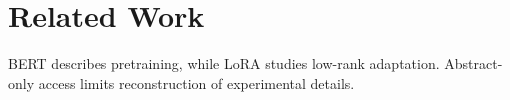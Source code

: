 \section{Related Work}
BERT describes pretraining\cite{devlin2019bert}, while LoRA studies low-rank adaptation\cite{hu2022lora}. Abstract-only access limits reconstruction of experimental details.
